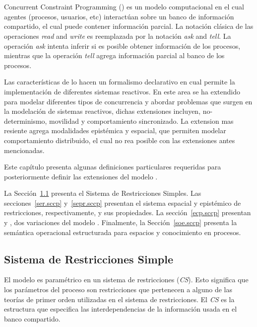 \chapter{\SCCP}
\label{chapter.sccp}      

Concurrent Constraint Programming (\textbf{\CCP}) es un modelo computacional en el cual agentes (procesos, usuarios, etc) interact\'uan sobre un banco de informaci\'on compartido, el cual puede contener informaci\'on parcial. La notaci\'on cl\'asica de las operaciones \textit{read} and \textit{write} es reemplazada por la notaci\'on \textit{ask} and \textit{tell}. La operaci\'on \textit{ask} intenta inferir si es posible obtener informaci\'on de los procesos, mientras que la operaci\'on \textit{tell} agrega informaci\'on parcial al banco de los procesos.

Las caracter\'isticas de \textbf{\CCP} lo hacen un formalismo declarativo en cual permite la implementaci\'on de diferentes sistemas reactivos. En este area \textbf{\CCP} se ha extendido para modelar diferentes tipos de concurrencia y abordar problemas que surgen en la modelaci\'on de sistemas reactivos, dichas extensiones incluyen, no-determinismo, movilidad y comportamiento sincronizado. La extension mas resiente agrega modalidades epist\'emica y espacial, que permiten modelar comportamiento distribuido, el cual no rea posible con las extensiones antes mencionadas.

Este cap\'itulo presenta algunas definiciones particulares requeridas para posteriormente definir las extensiones del modelo \textbf{\CCP}. 

La Secci\'on~\ref{srs.sccp} presenta el Sistema de Restricciones Simples. Las secciones~\ref{ser.sccp} y~\ref{sepr.sccp} presentan el sistema espacial y epist\'emico de restricciones, respectivamente, y sus propiedades. La secci\'on~\ref{ecp.sccp} presentan \SCCP y \ECCP, dos variaciones del modelo \CCP. Finalmente, la Secci\'on~\ref{soe.sccp} presenta la sem\'antica operacional estructurada para espacios y conocimiento en procesos.

\section{Sistema de Restricciones Simple}
\label{srs.sccp}

El modelo \textbf{\CCP} es param\'etrico en un sistema de restricciones (\textit{CS}). Esto significa que los par\'ametros del proceso son restricciones que pertenecen a alguno de las teor\'ias de primer orden utilizadas en el sistema de restricciones. El \textit{CS} es la estructura que especifica las interdependencias de la informaci\'on usada en el banco compartido. 

